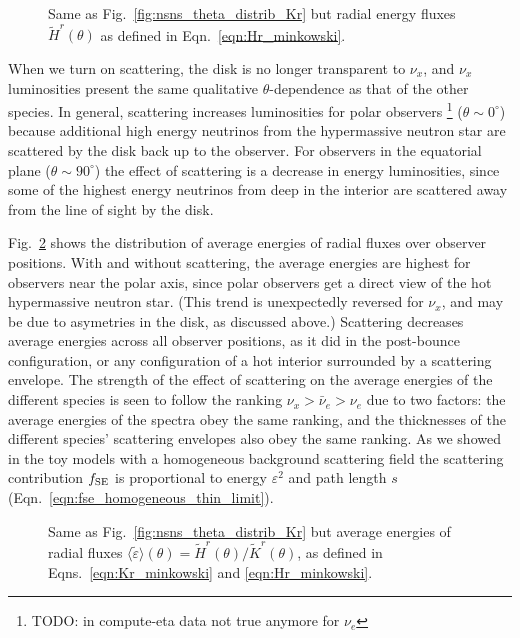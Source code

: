 \documentclass[aps,floatfix,prd,superscriptaddress,twocolumn]{revtex4-1}
\begin{document}
\begin{figure}
  \resizebox{\columnwidth}{!}{}
  \caption{Same as Fig.~\ref{fig:nsns_theta_distrib_Kr} but radial energy
    fluxes $\tilde{H}^r(\theta)$ as defined in Eqn.~\ref{eqn:Hr_minkowski}.
  }
  \label{fig:nsns_theta_distrib_Hr}
\end{figure}

When we turn on scattering, the disk is no longer transparent to $\nu_x$,
and $\nu_x$ luminosities present the same qualitative $\theta$-dependence
as that of the other species.
In general, scattering increases luminosities for polar observers
\footnote{TODO: in compute-eta data not true anymore for $\nu_e$}
($\theta \sim 0^\circ$) because additional high energy neutrinos
from the hypermassive neutron star are scattered by the disk back up to
the observer.
For observers in the equatorial plane ($\theta \sim 90^\circ$)
the effect of scattering is a decrease in energy luminosities,
since some of the highest energy neutrinos from deep in the interior
are scattered away from the line of sight by the disk.

Fig.~\ref{fig:nsns_theta_distrib_avg_eps} shows the distribution of
average energies of radial fluxes over observer positions.
With and without scattering, the average energies are highest
for observers near the polar axis, since polar observers get a
direct view of the hot hypermassive neutron star.
(This trend is unexpectedly reversed for $\nu_x$,
and may be due to asymetries in the disk, as discussed above.)
Scattering decreases average energies across all observer positions,
as it did in the post-bounce configuration, or any configuration of
a hot interior surrounded by a scattering envelope.
The strength of the effect of scattering on the average energies of
the different species is seen to follow the ranking
$\nu_x>\bar{\nu}_e>\nu_e$ due to two factors:
the average energies of the spectra obey the same ranking,
and the thicknesses of the different species' scattering envelopes
also obey the same ranking.
As we showed in the toy models with a homogeneous background scattering field
the scattering contribution $f_{\rm SE}$ is
proportional to energy $\varepsilon^2$ and path length $s$
(Eqn.~\ref{eqn:fse_homogeneous_thin_limit}).
\begin{figure}
  \resizebox{\columnwidth}{!}{}
  \caption{Same as Fig.~\ref{fig:nsns_theta_distrib_Kr} but
    average energies of radial fluxes
    $\langle\tilde{\varepsilon}\rangle(\theta)=\tilde{H}^r(\theta)/\tilde{K}^r(\theta)$,
    as defined in Eqns.~\ref{eqn:Kr_minkowski} and \ref{eqn:Hr_minkowski}.
  }
  \label{fig:nsns_theta_distrib_avg_eps}
\end{figure}
\end{document}

